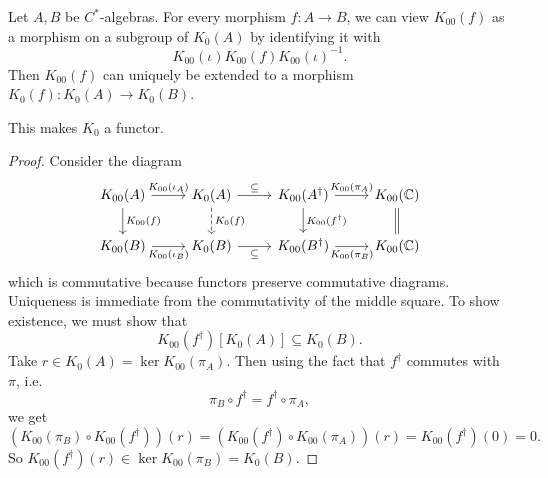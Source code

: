 \begin{lemma}
Let $A,B$ be $C^*$-algebras. For every morphism $f: A\to B$, we can view $K_{00}(f)$ as a morphism on a subgroup of $K_0(A)$ by identifying it with
\[ K_{00}(\iota)K_{00}(f)K_{00}(\iota)^{-1}. \]
Then $K_{00}(f)$ can uniquely be extended to a morphism $K_0(f): K_0(A)\to K_0(B)$. 

This makes $K_0$ a functor.
\end{lemma}
\begin{proof}
Consider the diagram
\[ \begin{tikzcd}
K_{00}(A) \rar{K_{00}(\iota_A)} \dar{K_{00}(f)} & K_0(A) \rar{\subseteq}\dar[dashed]{K_0(f)} & K_{00}(A^\dagger) \rar{K_{00}(\pi_A)}\dar{K_{00}(f^\dagger)} & K_{00}(\C) \ar[d, equals] \\
K_{00}(B) \rar[swap]{K_{00}(\iota_B)} & K_0(B) \rar[swap]{\subseteq} & K_{00}(B^\dagger) \rar[swap]{K_{00}(\pi_B)} & K_{00}(\C)
\end{tikzcd} \]
which is commutative because functors preserve commutative diagrams. Uniqueness is immediate from the commutativity of the middle square. To show existence, we must show that
\[ K_{00}(f^\dagger)[K_0(A)] \subseteq K_0(B). \]
Take $r \in K_0(A) = \ker K_{00}(\pi_A)$. Then using the fact that $f^\dagger$ commutes with $\pi$, i.e. 
\[ \pi_B \circ f^\dagger = f^\dagger\circ \pi_A,\]
we get 
\[ (K_{00}(\pi_B)\circ K_{00}(f^\dagger))(r) = (K_{00}(f^\dagger)\circ K_{00}(\pi_A))(r) = K_{00}(f^\dagger)(0) = 0. \]
So $K_{00}(f^\dagger)(r) \in \ker K_{00}(\pi_B) = K_0(B)$.
\end{proof}

